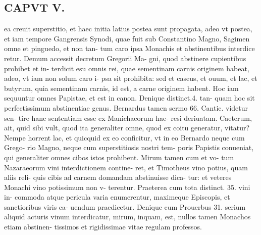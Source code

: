 \documentclass{article}
\begin{document}
\begin{pages}
\section*{CAPVT  V. }
\marginpar{[ p.879 ]}\pstart ea creuit superstitio, et haec initia latius postea sunt propagata, adeo vt postea, et iam tempore Gangrensis Synodi, quae fuit sub Constantino Magno, Sagimen omne et pinguedo, et non tan- tum caro ipsa Monachis et abstinentibus interdice retur. Demum accessit decretum Gregorii Ma- gni, quod abstinere cupientibus prohibet et in- terdicit esu omnis rei, quae sementinam carnis originem habeat, adeo, vt iam non solum caro i- psa sit prohibita: sed et caseus, et ouum, et lac, et butyrum, quia sementinam carnis, id est, a carne originem habent. Hoc iam sequuntur omnes Papistae, et est in canon. Denique distinct.4. tan- quam hoc sit perfectissimum abstinentiae genus. Bernardus tamen sermo 66. Cantic. videtur sen- tire hanc sententiam esse ex Manichaeorum hae- resi deriuatam. Caeterum, ait, quid sibi vult, quod ita generaliter omne, quod ex coitu generatur, vitatur? Nempe horrent lac, et quicquid ex eo conficitur, vt in eo Bernardo neque cum Grego- rio Magno, neque cum superstitiosis nostri tem- poris Papistis conueniat, qui generaliter omnes cibos istos prohibent. Mirum tamen cum et vo- tum Nazaraeorum vini interdictionem contine- ret, et Timotheus vino potius, quam aliis reli- quis cibis ad carnem domandam abstinuisse dica- tur: et veteres Monachi vino potissimum non v- terentur. Praeterea cum tota distinct. 35. vini in- commoda atque pericula varia enumerentur, maximeque Episcopis, et sanctioribus viris ca- uendum praedicetur. Denique cum Prouerbus 31. serium aliquid acturis vinum interdicatur, mirum, inquam, est, nullos tamen Monachos etiam abstinen- tissimos et rigidissimae vitae regulam professos.  \pend

\end{pages}
\end{document}
